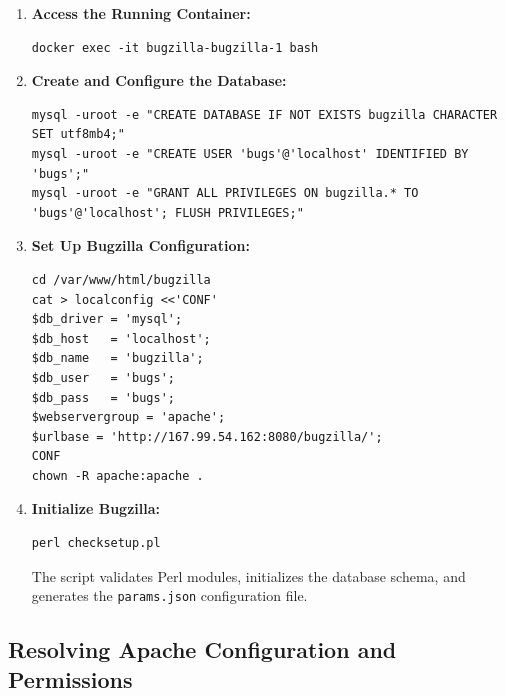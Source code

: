 \begin{enumerate}
    \item \textbf{Access the Running Container:}

    \begin{verbatim}
docker exec -it bugzilla-bugzilla-1 bash
    \end{verbatim}

    \item \textbf{Create and Configure the Database:}

    \begin{verbatim}
mysql -uroot -e "CREATE DATABASE IF NOT EXISTS bugzilla CHARACTER SET utf8mb4;"
mysql -uroot -e "CREATE USER 'bugs'@'localhost' IDENTIFIED BY 'bugs';"
mysql -uroot -e "GRANT ALL PRIVILEGES ON bugzilla.* TO 'bugs'@'localhost'; FLUSH PRIVILEGES;"
    \end{verbatim}

    \item \textbf{Set Up Bugzilla Configuration:}

    \begin{verbatim}
cd /var/www/html/bugzilla
cat > localconfig <<'CONF'
$db_driver = 'mysql';
$db_host   = 'localhost';
$db_name   = 'bugzilla';
$db_user   = 'bugs';
$db_pass   = 'bugs';
$webservergroup = 'apache';
$urlbase = 'http://167.99.54.162:8080/bugzilla/';
CONF
chown -R apache:apache .
    \end{verbatim}

    \item \textbf{Initialize Bugzilla:}

    \begin{verbatim}
perl checksetup.pl
    \end{verbatim}

    The script validates Perl modules, initializes the database schema, and generates the \texttt{params.json} configuration file.
\end{enumerate}

\subsection{Resolving Apache Configuration and Permissions}


